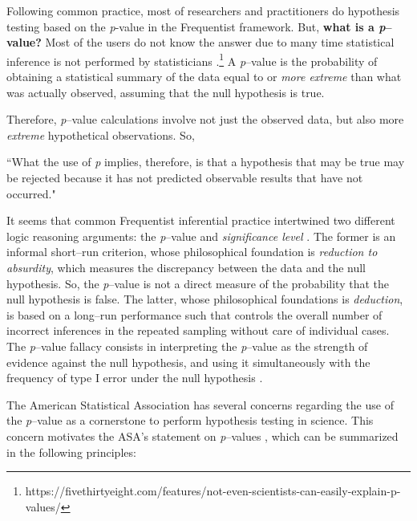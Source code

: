 Following common practice, most of researchers and practitioners do hypothesis testing based on the \textit{p}-value in the Frequentist framework. But, \textbf{what is a \textit{p}--value?} Most of the users do not know the answer due to many time statistical inference is not performed by statisticians \cite{Berger2006}.\footnote{https://fivethirtyeight.com/features/not-even-scientists-can-easily-explain-p-values/} A \textit{p}--value is the probability of obtaining a statistical summary of the data equal to or \textit{more extreme} than what was actually observed, assuming that the null hypothesis is true.

Therefore, \textit{p}--value calculations involve not just the observed data, but also more \textit{extreme} hypothetical observations. So,

``What the use of \textit{p} implies, therefore, is that a hypothesis that may be true may be rejected because it has not predicted observable results that have not occurred."\cite{Jeffreys1961}

It seems that common Frequentist inferential practice intertwined two different logic reasoning arguments: the \textit{p}--value \cite{Fisher1958} and \textit{significance level} \cite{Neyman1933}. The former is an informal short--run criterion, whose philosophical foundation is \textit{reduction to absurdity}, which measures the discrepancy between the data and the null hypothesis. So, the \textit{p}--value is not a direct measure of the probability that the null hypothesis is false. The latter, whose philosophical foundations is \textit{deduction}, is based on a long--run performance such that controls the overall number of incorrect inferences in the repeated sampling without care of individual cases. The \textit{p}--value fallacy consists in interpreting the \textit{p}--value as the strength of evidence against the null hypothesis, and using it simultaneously with the frequency of type I error under the null hypothesis \cite{Goodman1999}.

The American Statistical Association has several concerns regarding the use of the \textit{p}--value as a cornerstone to perform hypothesis testing in science. This concern motivates the ASA's statement on \textit{p}--values \cite{Wasserstein2016}, which can be summarized in the following principles:

